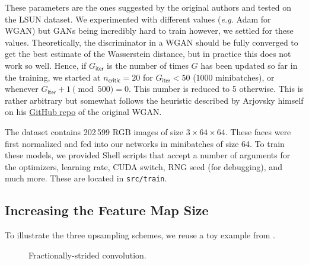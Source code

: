 \documentclass[table]{article}
\def\IsEven#1{%
      TT\fi
     \pgfmathparse{int(mod(#1,2))}%
     \ifnum\pgfmathresult=0
}
\newcommand{\code}[1]{{\color{Blue}\small\texttt{#1}}}
\begin{document}
These parameters are the ones suggested by the original authors and tested on the LSUN dataset. We experimented with different values (\textit{e.g.} Adam for WGAN) but GANs being incredibly hard to train however, we settled for these values. Theoretically, the discriminator in a WGAN should be fully converged to get the best estimate of the Wasserstein distance, but in practice this does not work so well. Hence, if $G_\textsf{iter}$ is the number of times $G$ has been updated so far in the training, we started at $n_\textsf{critic} = 20$ for $G_\textsf{iter} < 50$ (1000 minibatches), or whenever $G_\textsf{iter}+1 \pmod{500} = 0$. This number is reduced to 5 otherwise. This is rather arbitrary but somewhat follows the heuristic described by Arjovsky himself on his \href{https://github.com/martinarjovsky/wassersteingan}{GitHub repo} of the original WGAN.

The dataset contains 202\,599 RGB images of size $3 \times 64 \times 64$. These faces were first normalized and fed into our networks in minibatches of size 64. To train these models, we provided Shell scripts that accept a number of arguments for the optimizers, learning rate, CUDA switch, RNG seed (for debugging), and much more. These are located in \code{src/train}.

\subsection{Increasing the Feature Map Size}

To illustrate the three upsampling schemes, we reuse a toy example from \cite{odena2016deconvolution}.

\begin{figure}[ht]
  \centering
  \caption{Fractionally-strided convolution.}
\end{figure}
\end{document}
